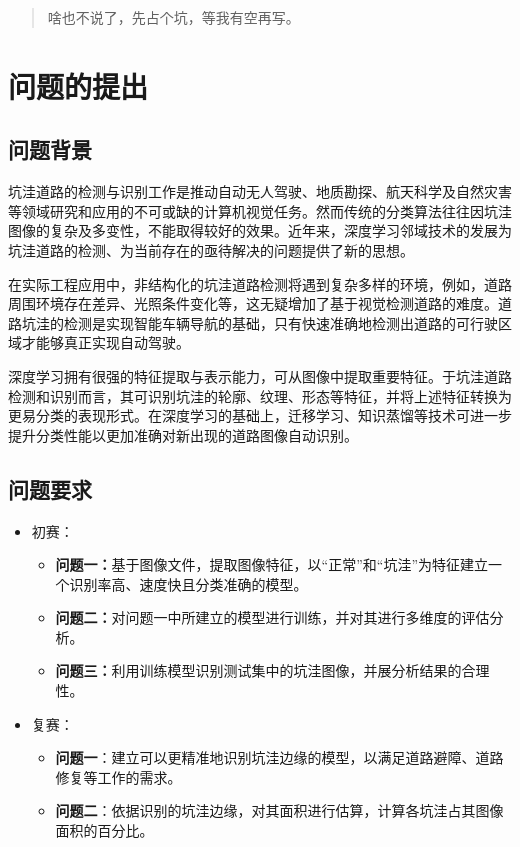 \documentclass{MathorCupmodeling}
\begin{document}
	\begin{abstract}
		啥也不说了，先占个坑，等我有空再写。
	\end{abstract}

	\pagestyle{empty}
	\tableofcontents
	\newpage
	\pagestyle{fancy}

	\setcounter{page}{1}
	\section{问题的提出}
	\subsection{问题背景}
	坑洼道路的检测与识别工作是推动自动无人驾驶、地质勘探、航天科学及自然灾害等领域研究和应用的不可或缺的计算机视觉任务。然而传统的分类算法往往因坑洼图像的复杂及多变性，不能取得较好的效果。近年来，深度学习邻域技术的发展为坑洼道路的检测、为当前存在的亟待解决的问题提供了新的思想。

	在实际工程应用中，非结构化的坑洼道路检测将遇到复杂多样的环境，例如，道路周围环境存在差异、光照条件变化等，这无疑增加了基于视觉检测道路的难度\textcolor{blue}{\cite{曹江华}}。道路坑洼的检测是实现智能车辆导航的基础，只有快速准确地检测出道路的可行驶区域才能够真正实现自动驾驶。

	深度学习拥有很强的特征提取与表示能力，可从图像中提取重要特征。于坑洼道路检测和识别而言，其可识别坑洼的轮廓、纹理、形态等特征，并将上述特征转换为更易分类的表现形式。在深度学习的基础上，迁移学习、知识蒸馏等技术可进一步提升分类性能以更加准确对新出现的道路图像自动识别。
	\subsection{问题要求}
	\begin{itemize}
		\item {\heiti 初赛：}
		\begin{itemize}
			\item \textbf{问题一：}基于图像文件，提取图像特征，以“正常”和“坑洼”为特征建立一个识别率高、速度快且分类准确的模型。
			\item \textbf{问题二：}对问题一中所建立的模型进行训练，并对其进行多维度的评估分析。
			\item \textbf{问题三：}利用训练模型识别测试集中的坑洼图像，并展分析结果的合理性。
		\end{itemize}
		\item {\heiti 复赛：}
		\begin{itemize}
			\item \textbf{问题一}：建立可以更精准地识别坑洼边缘的模型，以满足道路避障、道路修复等工作的需求。
			\item \textbf{问题二}：依据识别的坑洼边缘，对其面积进行估算，计算各坑洼占其图像面积的百分比。
		\end{itemize}
	\end{itemize}
\end{document}
